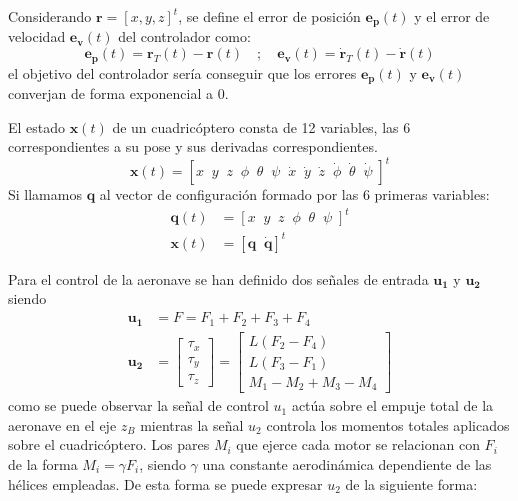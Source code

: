 Considerando $\mathbf{r} = [x,y,z]^t$, se define el error de posición $\mathbf{e_p}(t)$ y el error de velocidad $\mathbf{e_v}(t)$ del controlador como:
\begin{equation}
	\mathbf{e_p}(t) = \mathbf{r}_{T}(t) - \mathbf{r}(t) \quad;\quad 
\mathbf{e_v}(t) = \mathbf{\dot r}_{T}(t) - \mathbf{\dot r}(t)
\end{equation}
el objetivo del controlador sería conseguir que los errores $\mathbf{e_p}(t)$ y $\mathbf{e_v}(t)$ converjan de forma exponencial a 0.


El estado $\mathbf{x}(t)$ de un cuadricóptero consta de 12 variables, las 6 correspondientes a su pose y sus derivadas correspondientes.
\begin{equation}
\mathbf{x}(t) = \left[
	x  \;\;
	y  \;\;
	z  \;\;
	\phi  \;\;
	\theta  \;\;
	\psi  \;\;
	\dot{x}  \;\;
	\dot{y}  \;\;
	\dot{z}  \;\;
	\dot{\phi}  \;\;
	\dot{\theta}  \;\;
	\dot{\psi}\;\right]^t
\end{equation}
Si llamamos $\mathbf{q}$ al vector de configuración formado por las 6 primeras variables:
\begin{align}
	\mathbf{q}(t) &= \left[
	x  \;\;
	y  \;\;
	z  \;\;
	\phi  \;\;
	\theta  \;\;
	\psi  \;\right]^t\\
	\mathbf{x}(t) &= \left[\mathbf{q} \;\; \mathbf{\dot{q}}\right]^t
\end{align}

Para el control de la aeronave se han definido dos señales de entrada $\mathbf{u_1}$ y $\mathbf{u_2}$ siendo 
\begin{align}
	\mathbf{u_1}  &= F =  F_1 +F_2 +F_3 +F_4  \label{eq:u1}\\
	\mathbf{u_2}  &= \begin{bmatrix} \tau_x\\ 
		\tau_y\\
		\tau_z
	\end{bmatrix} =\begin{bmatrix}
	L (F_2-F_4)\\
	L (F_3-F_1)\\
	M_1 - M_2 + M_3 - M_4
\end{bmatrix}
\end{align} 
como se puede observar la señal de control $u_1$ actúa sobre el empuje total de la aeronave en el eje $z_B$ mientras la señal $u_2$ controla los momentos totales aplicados sobre el cuadricóptero. Los pares $M_i$ que ejerce cada motor se relacionan con $F_i$ de la forma $M_i = \gamma F_i$, siendo $\gamma$ una constante aerodinámica dependiente de las hélices empleadas. De esta forma se puede expresar $u_2$ de la siguiente forma:

